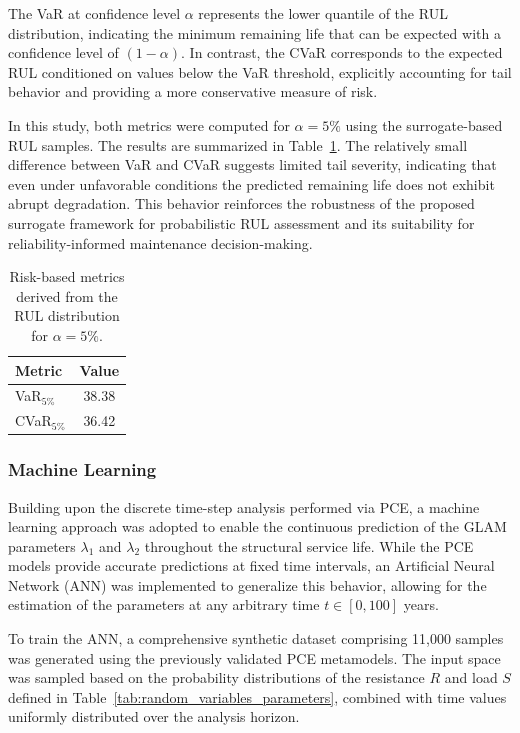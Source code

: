 The VaR at confidence level $\alpha$ represents the lower quantile of the RUL distribution, indicating the minimum remaining life that can be expected with a confidence level of $(1-\alpha)$. In contrast, the CVaR corresponds to the expected RUL conditioned on values below the VaR threshold, explicitly accounting for tail behavior and providing a more conservative measure of risk.

In this study, both metrics were computed for $\alpha = 5\%$ using the surrogate-based RUL samples. The results are summarized in Table~\ref{tab:var_cvar_rul}. The relatively small difference between VaR and CVaR suggests limited tail severity, indicating that even under unfavorable conditions the predicted remaining life does not exhibit abrupt degradation. This behavior reinforces the robustness of the proposed surrogate framework for probabilistic RUL assessment and its suitability for reliability-informed maintenance decision-making.

\begin{table}[H]
\centering
\caption{Risk-based metrics derived from the RUL distribution for $\alpha = 5\%$.}
\label{tab:var_cvar_rul}
\begin{tabular}{lc}
\hline
\textbf{Metric} & \textbf{Value} \\
\hline
VaR$_{5\%}$ & 38.38 \\
CVaR$_{5\%}$ & 36.42 \\
\hline
\end{tabular}
\end{table}





\subsubsection{Machine Learning}

Building upon the discrete time-step analysis performed via PCE, a machine learning approach was adopted to enable the continuous prediction of the GLAM parameters $\lambda_1$ and $\lambda_2$ throughout the structural service life. While the PCE models provide accurate predictions at fixed time intervals, an Artificial Neural Network (ANN) was implemented to generalize this behavior, allowing for the estimation of the parameters at any arbitrary time $t \in [0, 100]$ years.

To train the ANN, a comprehensive synthetic dataset comprising 11,000 samples was generated using the previously validated PCE metamodels. The input space was sampled based on the probability distributions of the resistance $R$ and load $S$ defined in Table~\ref{tab:random_variables_parameters}, combined with time values uniformly distributed over the analysis horizon.

